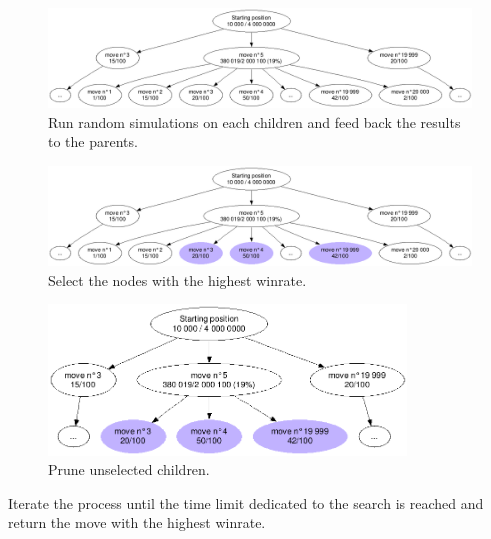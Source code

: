 \begin{figure}[H]
\centering
	\includegraphics[width=\textwidth]{3Methods/3.2MCTS/img/depth1.png}
	\caption{\label{fig:depth1}Run random simulations on each children and feed back the results to the parents.}
\end{figure}

\begin{figure}[H]
\centering
	\includegraphics[width=\textwidth]{3Methods/3.2MCTS/img/depth1-select.png}
	\caption{\label{fig:depth1-select}Select the nodes with the highest winrate.}
\end{figure}

\begin{figure}[H]
\centering
	\includegraphics[height=4cm]{3Methods/3.2MCTS/img/depth1-prune.png}
	\caption{\label{fig:depth1-prune}Prune unselected children.}
\end{figure}

Iterate the process until the time limit dedicated to the search is reached and return the move with the highest winrate.